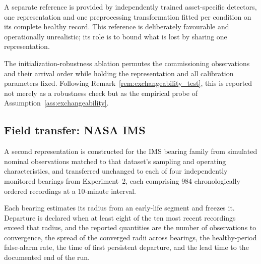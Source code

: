 \documentclass[a4paper]{cas-sc}
\begin{document}
A separate reference is provided by independently trained asset-specific
detectors, one representation and one preprocessing transformation fitted per
condition on its complete healthy record. This reference is deliberately
favourable and operationally unrealistic; its role is to bound what is lost by
sharing one representation.

The initialization-robustness ablation permutes the commissioning
observations and their arrival order while holding the representation and all
calibration parameters fixed. Following
Remark~\ref{rem:exchangeability_test}, this is reported not merely as a
robustness check but as the empirical probe of
Assumption~\ref{ass:exchangeability}.

\subsection{Field transfer: NASA IMS}
\label{subsec:design_nasa}

A second representation is constructed for the IMS bearing family from
simulated nominal observations matched to that dataset's sampling and
operating characteristics, and transferred unchanged to each of four
independently monitored bearings from Experiment~2, each comprising \(984\)
chronologically ordered recordings at a \(10\)-minute interval.

Each bearing estimates its radius from an early-life segment and freezes it.
Departure is declared when at least eight of the ten most recent recordings
exceed that radius, and the reported quantities are the number of observations
to convergence, the spread of the converged radii across bearings, the
healthy-period false-alarm rate, the time of first persistent departure, and
the lead time to the documented end of the run.
\end{document}
